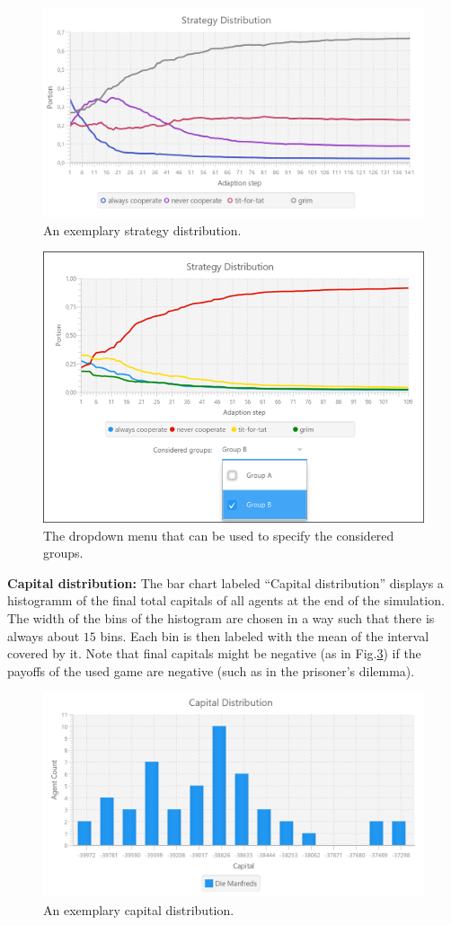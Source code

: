 \documentclass[parskip=full,11pt]{scrartcl}
\newcommand*\circled[1]{\tikz[baseline=(char.base)]{
            \node[shape=circle,draw,inner sep=2pt] (char) {#1};}}
\begin{document}
\begin{figure}[h]
	\centering
	\includegraphics[width=0.8\linewidth]{img_manual/strategy_distribution.png}
	\caption{An exemplary strategy distribution.}
	\label{fig:strategy_distribution}
\end{figure}

\begin{figure}[h]
	\centering
	\includegraphics[width = 0.6\linewidth]{img_manual/strategydiagram.png}
	\caption{The dropdown menu that can be used to specify the considered groups.}
	\label{consideredgroups}
\end{figure}

\textbf{Capital distribution:} The bar chart labeled \enquote{Capital distribution} \circled{3} displays a histogramm of the final total capitals of all agents at the end of the simulation. The width of the bins of the histogram are chosen in a way such that there is always about \(15\) bins. Each bin is then labeled with the mean of the interval covered by it. Note that final capitals might be negative (as in Fig.\ref{fig:capital_distribution}) if the payoffs of the used game are negative (such as in the prisoner's dilemma).

\begin{figure}[h]
	\centering
	\includegraphics[width=0.8\linewidth]{img_manual/capital_distribution.png}
	\caption{An exemplary capital distribution.}
	\label{fig:capital_distribution}
\end{figure}
\end{document}
